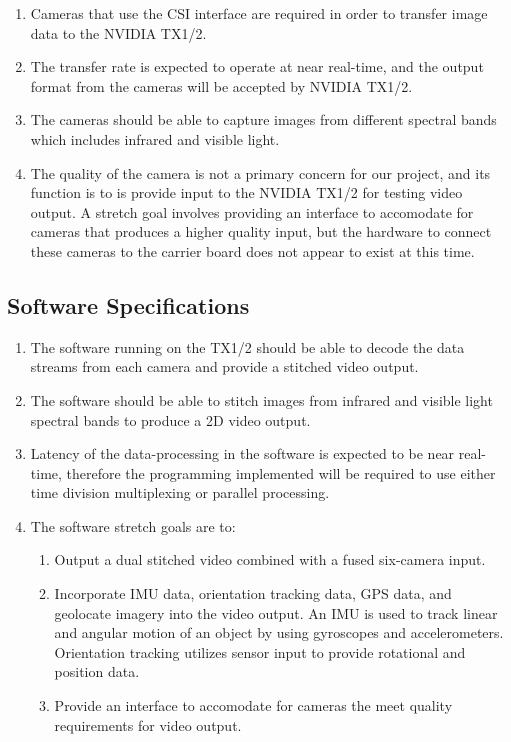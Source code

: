 \documentclass[letterpaper,10pt,serif,draftclsnofoot,onecolumn,compsoc,titlepage]{IEEEtran}
\begin{document}
\begin{enumerate}[label=\alph*]
	\item Cameras that use the CSI interface are required in order to transfer image data to 
	the NVIDIA TX1/2.\\
	\item The transfer rate is expected to operate at near real-time, and the output format 
	from the cameras will be accepted by NVIDIA TX1/2.\\
	\item The cameras should be able to capture images from different spectral bands 
	which includes infrared and visible light.\\
	\item The quality of the camera is not a primary concern for our project, and its 
	function is to is provide input to the NVIDIA TX1/2 for testing video output. 
	A stretch goal involves providing an interface to accomodate for cameras that 
	produces a higher quality input, but the hardware to connect these cameras to the 
	carrier board does not appear to exist at this time.\\
\end{enumerate}

\subsection{Software Specifications}

\begin{enumerate}[label=\alph*]
	\item The software running on the TX1/2 should be able to decode the data streams 
	from each camera and provide a stitched video output.\\
	\item The software should be able to stitch images from infrared 
	and visible light spectral bands to produce a 2D video output. \\
	\item Latency of the data-processing in the software is expected to be near 
	real-time, therefore the programming implemented will be required to use either time
	division multiplexing or parallel processing. \\
	\item The software stretch goals are to:
	\begin{enumerate}
	 	\item Output a dual stitched video combined with a fused six-camera input.\\
		\item Incorporate IMU data, orientation tracking data, GPS data, and geolocate 
		imagery into the video output. An IMU is used to track linear and angular 
		motion of an object by using gyroscopes and accelerometers. Orientation 
		tracking utilizes sensor input to provide rotational and position data.\\
		\item Provide an interface to accomodate for cameras the meet quality
		requirements for video output. \\
	\end{enumerate} 
\end{enumerate}
\end{document}

